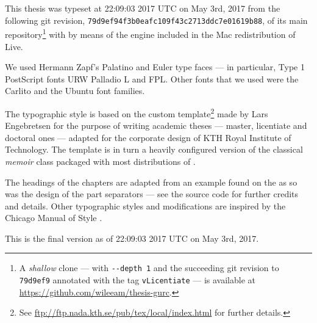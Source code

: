 
\newcommand{\GitTimestamp}{22:09:03 2017 UTC on May 3rd, 2017\xspace}
\newcommand{\GitRevisionLong}{\texttt{79d9ef94f3b0eafc109f43c2713ddc7e01619b88}\xspace}
\newcommand{\GitRevisionShort}{\texttt{79d9ef9}\xspace}

This thesis was typeset at \GitTimestamp from the following git revision, \GitRevisionLong, 
of its main repository\footnote{A \emph{shallow} clone --- with \texttt{-{}-depth 
1} and the succeeding git revision to \GitRevisionShort annotated with the tag \texttt{vLicentiate} 
--- is available at \url{https://github.com/wileeam/thesis-gurc}.}
with  by means of the  engine  included 
in the Mac redistribution of  Live.

We used Hermann Zapf’s Palatino and Euler type faces --- in particular, Type 1 PostScript 
fonts URW Palladio L and FPL. Other fonts that we used were the Carlito and the 
Ubuntu font families.

The typographic style is based on the custom template\footnote{See \url{ftp://ftp.nada.kth.se/pub/tex/local/index.html} 
for further details.} made by Lars Engebretsen for the purpose of writing academic 
theses --- master, licentiate and doctoral ones --- adapted for the corporate design 
of KTH Royal Institute of Technology. The template is in turn a heavily configured 
version of the classical \emph{memoir} class packaged with most distributions of 
. 

The headings of the chapters are adapted from an example found on the \Internet 
as so was the design of the part separators --- see the source code for further 
credits and details. Other typographic styles and modifications are inspired by 
the Chicago Manual of Style \cite{Chicago10}.

%
%

This is the final version as of \GitTimestamp.
